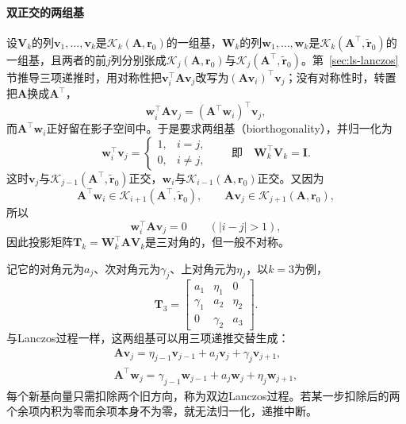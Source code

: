 \paragraph{双正交的两组基}
设$\bm V_k$的列$\bm v_1,\ldots,\bm v_k$是$\mathcal K_k(\bm A,\bm r_0)$的一组基，$\bm W_k$的列$\bm w_1,\ldots,\bm w_k$是$\mathcal K_k(\bm A^\top,\widetilde{\bm r}_0)$的一组基，且两者的前$j$列分别张成$\mathcal K_j(\bm A,\bm r_0)$与$\mathcal K_j(\bm A^\top,\widetilde{\bm r}_0)$。第~\ref{sec:ls-lanczos}节推导三项递推时，用对称性把$\bm v_i^\top\bm A\bm v_j$改写为$(\bm A\bm v_i)^\top\bm v_j$；没有对称性时，转置把$\bm A$换成$\bm A^\top$，
\[
 \bm w_i^\top\bm A\bm v_j=(\bm A^\top\bm w_i)^\top\bm v_j ,
\]
而$\bm A^\top\bm w_i$正好留在影子空间中。于是要求两组基（biorthogonality），并归一化为
\begin{equation}
 \bm w_i^\top\bm v_j=\begin{cases}1,&i=j,\\0,&i\ne j,\end{cases}\qquad\text{即}\quad \bm W_k^\top\bm V_k=\bm I .
 \label{eq:ls-bicg-biorthonormal}
\end{equation}
这时$\bm v_j$与$\mathcal K_{j-1}(\bm A^\top,\widetilde{\bm r}_0)$正交，$\bm w_i$与$\mathcal K_{i-1}(\bm A,\bm r_0)$正交。又因为
\[
 \bm A^\top\bm w_i\in\mathcal K_{i+1}(\bm A^\top,\widetilde{\bm r}_0),\qquad \bm A\bm v_j\in\mathcal K_{j+1}(\bm A,\bm r_0),
\]
所以
\[
 \bm w_i^\top\bm A\bm v_j=0\qquad(\lvert i-j\rvert>1),
\]
因此投影矩阵$\bm T_k=\bm W_k^\top\bm A\bm V_k$是三对角的，但一般不对称。

记它的对角元为$a_j$、次对角元为$\gamma_j$、上对角元为$\eta_j$，以$k=3$为例，
\[
 \bm T_3=\begin{bmatrix}a_1&\eta_1&0\\\gamma_1&a_2&\eta_2\\0&\gamma_2&a_3\end{bmatrix}.
\]
与Lanczos过程一样，这两组基可以用三项递推交替生成：
\begin{equation}
 \begin{gathered}
 \bm A\bm v_j=\eta_{j-1}\bm v_{j-1}+a_j\bm v_j+\gamma_j\bm v_{j+1},\\
 \bm A^\top\bm w_j=\gamma_{j-1}\bm w_{j-1}+a_j\bm w_j+\eta_j\bm w_{j+1},
 \end{gathered}
 \label{eq:ls-bicg-two-sided-lanczos}
\end{equation}
每个新基向量只需扣除两个旧方向，称为双边Lanczos过程。若某一步扣除后的两个余项内积为零而余项本身不为零，就无法归一化，递推中断。

